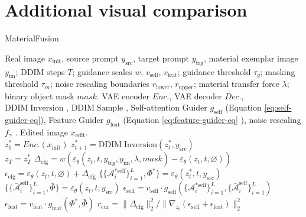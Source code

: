 \section{Additional visual comparison}
\label{appendix:qual_anal}

\begin{algorithm}[ht!]
\caption{MaterialFusion}\label{alg:overall_pipeline}
    \begin{algorithmic}[1]
        \Input Real image $x_{\mathrm{init}}$, source prompt $y_{\mathrm{src}}$, target prompt $y_{\mathrm{trg}}$, material exemplar image $y_{\mathrm{im}}$; DDIM steps $T$; guidance scales $w$, $v_{\mathrm{self}}$, $v_{\mathrm{feat}}$; guidance threshold $\tau_g$; masking threshold $\tau_m$; noise rescaling boundaries $r_{\mathrm{lower}}$, $r_{\mathrm{upper}}$; material transfer force $\lambda$; binary object mask $mask$.
        \Function VAE encoder $Enc.$, VAE decoder $Dec.$, $\mathrm{DDIM\;Inversion}$  \cite{song2020denoising}, $\mathrm{DDIM\;Sample}$ \cite{song2020denoising}, Self-attention Guider $g_{\mathrm{self}}$ (Equation \ref{eq:self-guider-eq}), Feature Guider $g_{\mathrm{feat}}$ (Equation \ref{eq:feature-guider-eq} ), noise rescaling $f_{\gamma}$ \cite{titov2024guideandrescaleselfguidancemechanismeffective}.
        \Output Edited image $x_{\mathrm{edit}}$.
        \\$z^*_0 = Enc.(x_{\mathrm{init}})$
            \State $z^*_{t+1} = \mathrm{DDIM\;Inversion}(z^*_t, y_{\mathrm{src}})$
        \EndFor
        \\$z_T = z^*_T$
            \State $\Delta_{\mathrm{cfg}} = w (\varepsilon_{\theta}(z_t, t, y_{\mathrm{trg}}, y_{\mathrm{im}}, \lambda, mask) - \varepsilon_{\theta}(z_t, t,\varnothing))$
            \State $\epsilon_{\mathrm{cfg}} = \varepsilon_{\theta}(z_t, t, \varnothing) + \Delta_{\mathrm{cfg}}$
            \State $\big\{ \{\mathcal{A}^{*\mathrm{self}}_i\}_{i=1}^L, \Phi^* \big\}= \varepsilon_{\theta}(z^*_t, t, y_{\mathrm{src}}) $
            \State $\big\{ \{\bar{\mathcal{A}}^{\mathrm{self}}_i\}_{i=1}^L, \bar{\Phi} \big\}= \varepsilon_{\theta}(z_t, t, y_{\mathrm{src}}) $
            \State $\epsilon_{\mathrm{self}} = v_{\mathrm{self}} \cdot g_{\mathrm{self}}(\{\mathcal{A}^{*\mathrm{self}}_i\}_{i=1}^L, \{\bar{\mathcal{A}}^{\mathrm{self}}_i\}_{i=1}^L)$
            \State $\epsilon_{\mathrm{feat}} = v_{\mathrm{feat}} \cdot g_{\mathrm{feat}}(\Phi^*, \bar{\Phi})$
            \State $r_{\mathrm{cur}} = \|\Delta_{\mathrm{cfg}}\|^2_2 / \| \nabla_{z_t} (\epsilon_{\mathrm{self}} +\epsilon_{\mathrm{feat}}) \|^2_2$

\end{algorithmic}
\end{algorithm}
